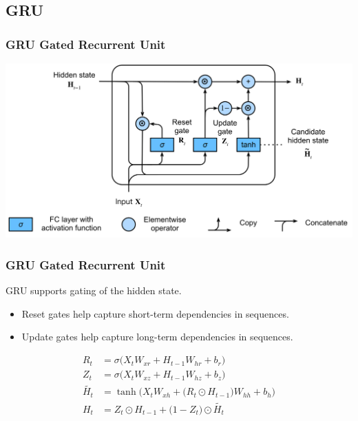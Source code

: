 \documentclass[]{beamer}
\begin{document}
\subsection{GRU}
\begin{frame}
    \frametitle{GRU\: Gated Recurrent Unit} 
    \includegraphics[scale = 0.1]{GRU.png}
\end{frame}
\begin{frame}
    \frametitle{GRU\: Gated Recurrent Unit} 
    GRU supports gating of the hidden state.
    \begin{itemize}[label=\textbullet]
        \item Reset gates help capture short-term dependencies in sequences.
        \item Update gates help capture long-term dependencies in sequences.
    \end{itemize}
    \begin{align*}
        R_t &= \sigma\bigl(X_t W_{xr} + H_{t-1}W_{hr} + b_r\bigr) \\
        Z_t &= \sigma\bigl(X_t W_{xz} + H_{t-1}W_{hz} + b_z\bigr) \\
        \tilde{H_t} &= \tanh \bigl(X_t W_{xh} + \bigl(R_t \odot H_{t-1}\bigr)W_{hh} + b_h\bigr) \\
        H_t &= Z_t \odot H_{t-1} + \bigl(1-Z_t\bigr) \odot \tilde{H_t} 
    \end{align*}
\end{frame}
\end{document}
